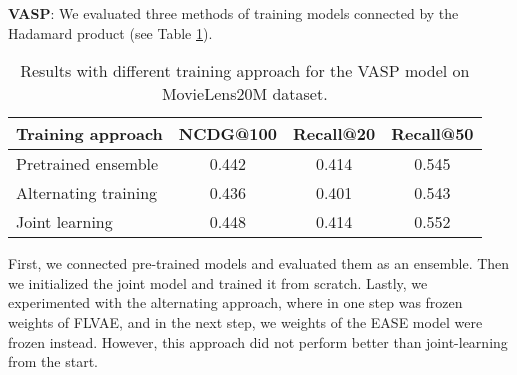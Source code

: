 \documentclass[conference]{IEEEtran}
\begin{document}
    \textbf{VASP}: We evaluated three methods of training models connected by the Hadamard product (see Table \ref{tab:3}). 
    
    \begin{table}[h]\label{tab:3}\caption{Results with different training approach for the VASP model on MovieLens20M dataset.}
        \centering
        \begin{tabular}{@{}llll@{}}
            \toprule
            Training approach & NCDG@100 & Recall@20 & Recall@50 \\ 
            \midrule
            Pretrained ensemble  & \multicolumn{1}{c}{0.442} & \multicolumn{1}{c}{0.414} & \multicolumn{1}{c}{0.545}           \\
            Alternating training & \multicolumn{1}{c}{0.436} & \multicolumn{1}{c}{0.401} & \multicolumn{1}{c}{0.543} \\
            Joint learning &   \multicolumn{1}{c}{0.448} & \multicolumn{1}{c}{0.414} & \multicolumn{1}{c}{0.552}             \\ 
            \bottomrule
        \end{tabular}
        \centering
    \end{table}
    
  
    
    First, we connected pre-trained models and evaluated them as an ensemble. Then we initialized the joint model and trained it from scratch. Lastly, we experimented with the alternating approach, where in one step was frozen weights of FLVAE, and in the next step, we weights of the EASE model were frozen instead. However, this approach did not perform better than joint-learning from the start.
    
\end{document}
